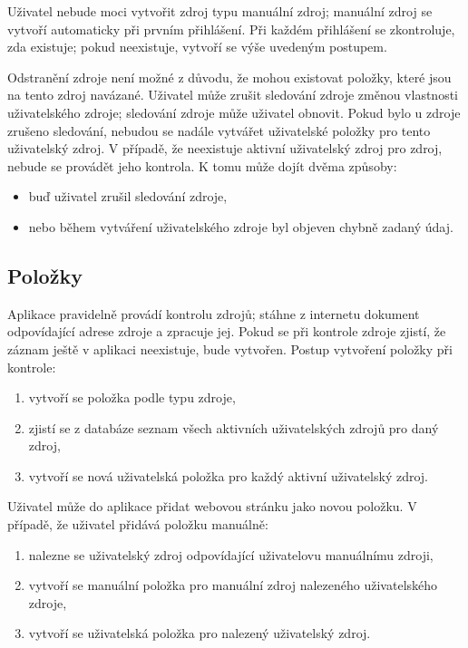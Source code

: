 Uživatel nebude moci vytvořit zdroj typu manuální zdroj; manuální zdroj se vytvoří automaticky při prvním přihlášení.
Při každém přihlášení se zkontroluje, zda existuje; pokud neexistuje, vytvoří se výše uvedeným postupem.

Odstranění zdroje není možné z důvodu, že mohou existovat položky, které jsou na tento zdroj navázané.
Uživatel může zrušit sledování zdroje změnou vlastnosti uživatelského zdroje; sledování zdroje může uživatel obnovit.
Pokud bylo u zdroje zrušeno sledování, nebudou se nadále vytvářet uživatelské položky pro tento uživatelský zdroj.
V případě, že neexistuje aktivní uživatelský zdroj pro zdroj, nebude se provádět jeho kontrola.
K tomu může dojít dvěma způsoby:
\begin{itemize}
	\item buď uživatel zrušil sledování zdroje,
	\item nebo během vytváření uživatelského zdroje byl objeven chybně zadaný údaj.
\end{itemize}

\subsection{Položky}

Aplikace pravidelně provádí kontrolu zdrojů; stáhne z internetu dokument odpovídající adrese zdroje a zpracuje jej.
Pokud se při kontrole zdroje zjistí, že záznam ještě v aplikaci neexistuje, bude vytvořen.
Postup vytvoření položky při kontrole:
\begin{enumerate}
	\item vytvoří se položka podle typu zdroje,
	\item zjistí se z databáze seznam všech aktivních uživatelských zdrojů pro daný zdroj,
	\item vytvoří se nová uživatelská položka pro každý aktivní uživatelský zdroj.
\end{enumerate}

Uživatel může do aplikace přidat webovou stránku jako novou položku.
V případě, že uživatel přidává položku manuálně:
\begin{enumerate}
	\item nalezne se uživatelský zdroj odpovídající uživatelovu manuálnímu zdroji,
	\item vytvoří se manuální položka pro manuální zdroj nalezeného uživatelského zdroje,
	\item vytvoří se uživatelská položka pro nalezený uživatelský zdroj.
\end{enumerate}


